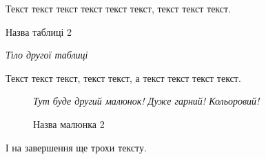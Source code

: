 \documentclass{report}
\theoremstyle{plain}
\theoremstyle{remark}
\begin{document}
Текст текст текст текст текст текст, текст текст текст.

\begin{table}[htbp]
\caption{Назва таблиці 2}\label{tab:table2}
\emph{Тіло другої таблиці}
\end{table}

Текст текст текст, текст текст, а текст текст текст текст.

\begin{figure}[htbp]
\emph{Тут буде другий малюнок! Дуже гарний! Кольоровий!}
\caption{Назва малюнка 2}\label{fig:figure2}
\end{figure}

І на завершення ще трохи тексту.
\end{document}
